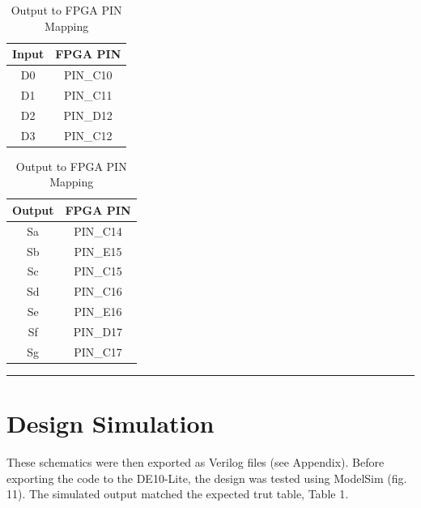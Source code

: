 \documentclass{article}
\begin{document}
\begin{table}[H]
\centering
\begin{minipage}{0.45\textwidth}
\centering
\begin{tabular}{|c|c|}
\hline
Input & FPGA PIN \\
\hline
D0 & PIN\_C10 \\ \hline
D1 & PIN\_C11 \\ \hline
D2 & PIN\_D12 \\ \hline
D3 & PIN\_C12 \\
\hline
\end{tabular}
\caption{Input to FPGA PIN Mapping}
\end{minipage}
\hfill
\begin{minipage}{0.45\textwidth}
\centering
\begin{tabular}{|c|c|}
\hline
Output & FPGA PIN \\
\hline
Sa & PIN\_C14 \\ \hline
Sb & PIN\_E15 \\ \hline
Sc & PIN\_C15 \\ \hline
Sd & PIN\_C16 \\ \hline
Se & PIN\_E16 \\ \hline
Sf & PIN\_D17 \\ \hline
Sg & PIN\_C17 \\
\hline
\end{tabular}
\caption{Output to FPGA PIN Mapping}
\end{minipage}
\end{table}
\vspace{5mm}
\hrule
\section*{\textcolor{mycolor}{Design Simulation}}
These schematics were then exported as Verilog files (see Appendix). Before exporting the code to the DE10-Lite, the design was tested using ModelSim (fig. 11). The simulated output matched the expected trut table, Table 1.
\end{document}
